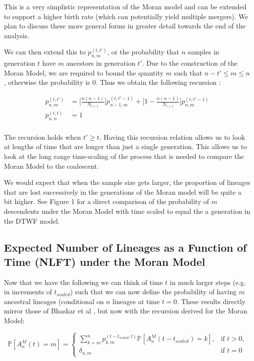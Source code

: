 \documentclass[11pt]{article}
\begin{document}
This is a very simplistic representation of the Moran model and can be extended to support a higher birth rate (which can potentially yield multiple mergers). We plan to discuss these more general forms in greater detail towards the end of the analysis. 

We can then extend this to $p^{(t, t')}_{n,m}$, or the probability that $n$ samples in generation $t$ have $m$  ancestors in generation $t'$. Due to the construction of the Moran Model, we are required to bound the quantity $m$ such that $n-t' \leq m \leq n$, otherwise the probability is $0$. Thus we obtain the following recursion :

$$
\begin{aligned}
	p^{(t, t')}_{n,m} &= \Bigg[\frac{n(n-1)}{N_{t+1}}\Bigg] p^{(t, t'-1)}_{n-1, m} + \Bigg[1 - \frac{n(n-1)}{N_{t+1}}\Bigg] p^{(t, t'-1)}_{n,m}\\
	p^{(t, t)}_{n,n} &= 1\\
\end{aligned}
$$

The recursion holds when $t' \geq t$. Having this recursion relation allows us to look at lengths of time that are longer than just a single generation. This allows us to look at the long range time-scaling of the process that is needed to compare the Moran Model to the coalescent.  

We would expect that when the sample size gets larger, the proportion of lineages that are lost successively in the generations of the Moran model will be quite a bit higher. See Figure 1 for a direct comparison of the probability of $m$ descendents under the Moran Model with time scaled to equal the a generation in the DTWF model. 

\subsection{Expected Number of Lineages as a Function of Time (NLFT) under the Moran Model}

Now that we have the following we can think of time $t$ in much larger steps (e.g. in increments of $t_{scaled}$) such that we can now define the probability of having $m$ ancestral lineages (conditional on $n$ lineages at time $t = 0$. These results directly mirror those of Bhaskar et al \cite{Bhaskar2014}, but now with the recursion derived for the Moran Model:

 \begin{equation}
	 \mathbb{P}[A^M_n(t) = m] =
	 \begin{cases} 
		 \sum^n_{k=m}  p^{(t-t_{scaled}, t)}_{k,m} \mathbb{P}[A^M_n (t-t_{scaled}) = k],  &\text{if $t > 0$,}
	 	 \\
		 \delta_{n,m} &\text{if $t = 0$}
	 \end{cases}
 \end{equation}
\end{document}
